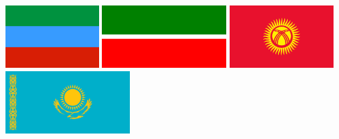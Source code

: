 \documentclass[fontscale=0.3,landscape,paperwidth=72in,paperheight=36in]{baposter}  %
\begin{document}
\begin{poster}
{			%
		}{
				\includegraphics[height=6.5em]{Flag_of_Dagestan}
				\hspace{1cm}\includegraphics[height=6.5em]{Flag_of_Tatarstan}
				\hspace{1cm}\includegraphics[height=6.5em]{Flag_of_Kyrgyzstan}
				\hspace{1cm}\includegraphics[height=6.5em]{Flag_of_Kazakhstan}
		}



\end{poster}
\end{document}
